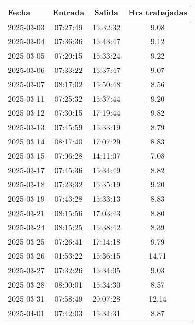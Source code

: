 \documentclass[11pt,a4paper]{article}
\newcommand{\mejoradatabla}[1]{
  \renewcommand{\arraystretch}{1.3}
  \setlength{\tabcolsep}{10pt}
  #1
  \renewcommand{\arraystretch}{1}
  \setlength{\tabcolsep}{6pt}
}
\begin{document}
\begin{minipage}[t]{0.62\textwidth}
\mejoradatabla{
\begin{tabular}{lccc}
\toprule
\rowcolor{grisclaro} \textbf{Fecha} & \textbf{Entrada} & \textbf{Salida} & \textbf{Hrs trabajadas}\\
\midrule

2025-03-03 & 07:27:49 & 16:32:32 & 9.08\\

2025-03-04 & 07:36:36 & 16:43:47 & 9.12\\

2025-03-05 & 07:20:15 & 16:33:24 & 9.22\\

2025-03-06 & 07:33:22 & 16:37:47 & 9.07\\

2025-03-07 & 08:17:02 & 16:50:48 & 8.56\\

2025-03-11 & 07:25:32 & 16:37:44 & 9.20\\

2025-03-12 & 07:30:15 & 17:19:44 & 9.82\\

2025-03-13 & 07:45:59 & 16:33:19 & 8.79\\

2025-03-14 & 08:17:40 & 17:07:29 & 8.83\\

2025-03-15 & 07:06:28 & 14:11:07 & 7.08\\

2025-03-17 & 07:45:36 & 16:34:49 & 8.82\\

2025-03-18 & 07:23:32 & 16:35:19 & 9.20\\

2025-03-19 & 07:43:28 & 16:33:13 & 8.83\\

2025-03-21 & 08:15:56 & 17:03:43 & 8.80\\

2025-03-24 & 08:15:25 & 16:38:42 & 8.39\\

2025-03-25 & 07:26:41 & 17:14:18 & 9.79\\

2025-03-26 & 01:53:22 & 16:36:15 & 14.71\\

2025-03-27 & 07:32:26 & 16:34:05 & 9.03\\

2025-03-28 & 08:00:01 & 16:34:30 & 8.57\\

2025-03-31 & 07:58:49 & 20:07:28 & 12.14\\

2025-04-01 & 07:42:03 & 16:34:31 & 8.87\\

\bottomrule
\end{tabular}
}
\end{minipage}
\end{document}
